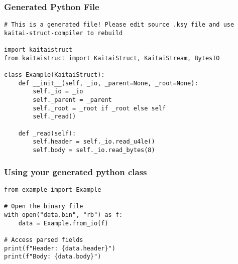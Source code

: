 \begin{frame}[fragile]
\frametitle{Generated Python File}


\begin{lstlisting}
# This is a generated file! Please edit source .ksy file and use kaitai-struct-compiler to rebuild

import kaitaistruct
from kaitaistruct import KaitaiStruct, KaitaiStream, BytesIO

class Example(KaitaiStruct):
    def __init__(self, _io, _parent=None, _root=None):
        self._io = _io
        self._parent = _parent
        self._root = _root if _root else self
        self._read()

    def _read(self):
        self.header = self._io.read_u4le()
        self.body = self._io.read_bytes(8)

\end{lstlisting}
\end{frame}


\begin{frame}[fragile]
\frametitle{Using your generated python class}

\begin{lstlisting}
from example import Example

# Open the binary file
with open("data.bin", "rb") as f:
    data = Example.from_io(f)

# Access parsed fields
print(f"Header: {data.header}")
print(f"Body: {data.body}")
\end{lstlisting}
\end{frame}
